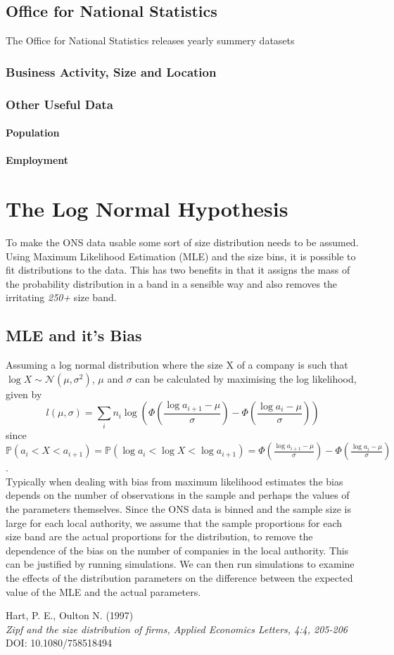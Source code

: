 \documentclass[a4paper,10pt]{article}
\begin{document}
   \subsection{Office for National Statistics}
   The Office for National Statistics releases yearly summery datasets
   \subsubsection{Business Activity, Size and Location}
   \subsubsection{Other Useful Data}
   \paragraph{Population}
   \paragraph{Employment}

   \section{The Log Normal Hypothesis}
   To make the ONS data usable some sort of size distribution needs to be assumed. Using Maximum Likelihood Estimation (MLE) and the size bins, it is possible to fit distributions to the data. This has two benefits in that it assigns the mass of the probability distribution in a band in a sensible way and also removes the irritating \emph{250+} size band.
   \subsection{MLE and it's Bias}
   Assuming a log normal distribution where the size X of a company is such that $\log X \sim \mathcal{N}(\mu, \sigma^2)$, $\mu$ and $\sigma$ can be calculated by maximising the log likelihood, given by
   \begin{equation}
   l(\mu, \sigma) = \sum_i n_i \log \left( \Phi \left( \frac{\log a_{i + 1} - \mu}{\sigma} \right) - \Phi \left( \frac{\log a_{i} - \mu}{\sigma} \right) \right)
   \end{equation}
   since $\mathbb{P}(a_i < X < a_{i + 1}) = \mathbb{P}(\log a_i < \log X < \log a_{i + 1}) = \Phi \left( \frac{\log a_{i + 1} - \mu}{\sigma} \right) - \Phi \left( \frac{\log a_{i} - \mu}{\sigma} \right)$. \\
   Typically when dealing with bias from maximum likelihood estimates the bias depends on the number of observations in the sample and perhaps the values of the parameters themselves. Since the ONS data is binned and the sample size is large for each local authority, we assume that the sample proportions for each size band are the actual proportions for the distribution, to remove the dependence of the bias on the number of companies in the local authority. This can be justified by running simulations. We can then run simulations to examine the effects of the distribution parameters on the difference between the expected value of the MLE and the actual parameters.  

   \begin{thebibliography}{9}
   Hart, P. E., Oulton N. (1997)
   \\ \textit{Zipf and the size distribution of firms, Applied Economics Letters, 4:4, 205-206}
   \\ DOI: 10.1080/758518494 
   \end{thebibliography}
\end{document}

